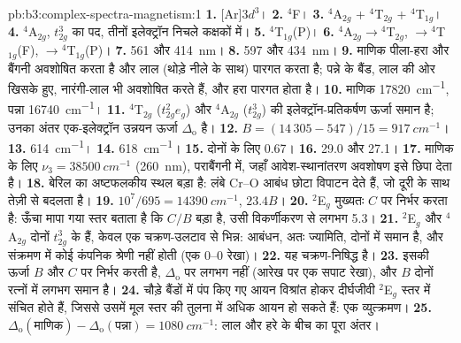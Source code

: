\begin{solution}{pb:b3:complex-spectra-magnetism:1}
\textbf{1.} [Ar]$3d^3$।
\textbf{2.} $^4$F।
\textbf{3.} $^4$A$_{2g}$ + $^4$T$_{2g}$ + $^4$T$_{1g}$।
\textbf{4.} $^4$A$_{2g}$, $t_{2g}^3$ का पद, तीनों इलेक्ट्रॉन निचले कक्षकों में।
\textbf{5.} $^4$T$_{1g}$(P)।
\textbf{6.} $^4$A$_{2g}\to{}^4$T$_{2g}$, $\to{}^4$T$_{1g}$(F), $\to{}^4$T$_{1g}$(P)।
\textbf{7.} 561 और \qty{414}{nm}।
\textbf{8.} 597 और \qty{434}{nm}।
\textbf{9.} माणिक पीला-हरा और बैंगनी अवशोषित करता है और लाल (थोड़े नीले के साथ) पारगत करता है;
पन्ने के बैंड, लाल की ओर खिसके हुए, नारंगी-लाल भी अवशोषित करते हैं, और हरा
पारगत होता है।
\textbf{10.} माणिक \qty{17820}{cm^{-1}}, पन्ना \qty{16740}{cm^{-1}}।
\textbf{11.} $^4$T$_{2g}$ ($t_{2g}^2e_g$) और $^4$A$_{2g}$ ($t_{2g}^3$) की इलेक्ट्रॉन-प्रतिकर्षण ऊर्जा समान है; उनका
अंतर एक-इलेक्ट्रॉन उन्नयन ऊर्जा $\Delta_{\mathrm o}$ है।
\textbf{12.} $B = (14\,305 - 547)/15 = \qty{917}{cm^{-1}}$।
\textbf{13.} \qty{614}{cm^{-1}}।
\textbf{14.} \qty{618}{cm^{-1}}।
\textbf{15.} दोनों के लिए 0.67।
\textbf{16.} 29.0 और 27.1।
\textbf{17.} माणिक के लिए $\nu_3 = \qty{38500}{cm^{-1}}$ (\qty{260}{nm}), पराबैंगनी में, जहाँ आवेश-स्थानांतरण
अवशोषण इसे छिपा देता है।
\textbf{18.} बेरिल का अष्टफलकीय स्थल बड़ा है: लंबे Cr--O आबंध छोटा
विपाटन देते हैं, जो दूरी के साथ तेज़ी से बदलता है।
\textbf{19.} $10^7/695 = \qty{14390}{cm^{-1}}$, $23.4B$।
\textbf{20.} $^2$E$_g$ मुख्यतः $C$ पर निर्भर करता है: ऊँचा मापा गया स्तर बताता है कि $C/B$ बड़ा है,
उसी विकर्णीकरण से लगभग 5.3।
\textbf{21.} $^2$E$_g$ और $^4$A$_{2g}$ दोनों $t_{2g}^3$ के हैं, केवल एक चक्रण-उलटाव से भिन्न: आबंधन,
अतः ज्यामिति, दोनों में समान है, और संक्रमण में कोई कंपनिक
श्रेणी नहीं होती (एक 0--0 रेखा)।
\textbf{22.} यह चक्रण-निषिद्ध है।
\textbf{23.} इसकी ऊर्जा $B$ और $C$ पर निर्भर करती है, $\Delta_{\mathrm o}$ पर लगभग नहीं (आरेख पर एक सपाट रेखा),
और $B$ दोनों रत्नों में लगभग समान है।
\textbf{24.} चौड़े बैंडों में पंप किए गए आयन विश्रांत होकर दीर्घजीवी
$^2$E$_g$ स्तर में संचित होते हैं, जिससे उसमें मूल स्तर की तुलना में अधिक आयन हो सकते हैं: एक 
व्युत्क्रमण।
\textbf{25.} \textbf{$\Delta_{\mathrm o}(\text{माणिक}) - \Delta_{\mathrm o}(\text{पन्ना}) = \qty{1080}{cm^{-1}}$}: लाल और
हरे के बीच का पूरा अंतर।
\end{solution}
